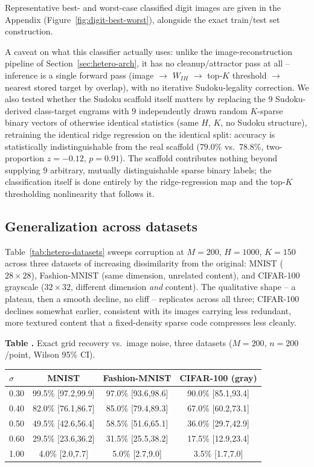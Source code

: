 \documentclass[11pt]{article}
\newcommand{\toprule}{\hline\hline}
\newcommand{\midrule}{\hline}
\newcommand{\bottomrule}{\hline\hline}
\begin{document}
Representative best- and worst-case classified digit images are given in the Appendix
(Figure~\ref{fig:digit-best-worst}), alongside the exact train/test set construction.

A caveat on what this classifier actually uses: unlike the image-reconstruction pipeline of
Section~\ref{sec:hetero-arch}, it has no cleanup/attractor pass at all -- inference is a single
forward pass (image $\to$ $W_{IH}$ $\to$ top-$K$ threshold $\to$ nearest stored target by
overlap), with no iterative Sudoku-legality correction. We also tested whether the Sudoku
scaffold itself matters by replacing the $9$ Sudoku-derived class-target engrams with $9$
independently drawn random $K$-sparse binary vectors of otherwise identical statistics (same
$H$, $K$, no Sudoku structure), retraining the identical ridge regression on the identical
split: accuracy is statistically indistinguishable from the real scaffold ($79.0\%$ vs.\
$78.8\%$, two-proportion $z=-0.12$, $p=0.91$). The scaffold contributes nothing beyond
supplying $9$ arbitrary, mutually distinguishable sparse binary labels; the classification
itself is done entirely by the ridge-regression map and the top-$K$ thresholding nonlinearity
that follows it.

\subsection{Generalization across datasets}
\label{sec:generalization}

Table~\ref{tab:hetero-datasets} sweeps corruption at $M{=}200$, $H{=}1000$, $K{=}150$ across
three datasets of increasing dissimilarity from the original: MNIST ($28\times28$), Fashion-MNIST
(same dimension, unrelated content), and CIFAR-100 grayscale ($32\times32$, different dimension
\emph{and} content). The qualitative shape -- a plateau, then a smooth decline, no cliff --
replicates across all three; CIFAR-100 declines somewhat earlier, consistent with its images
carrying less redundant, more textured content that a fixed-density sparse code compresses less
cleanly.

\label{tab:hetero-datasets}
\noindent\textbf{Table \thetable.} Exact grid recovery vs.\ image noise, three datasets ($M{=}200$, $n{=}200$/point,
Wilson 95\% CI).
\begin{center}
\begin{tabular}{lccc}
\toprule
$\sigma$ & MNIST & Fashion-MNIST & CIFAR-100 (gray) \\
\midrule
0.30 & 99.5\% [97.2,99.9] & 97.0\% [93.6,98.6] & 90.0\% [85.1,93.4] \\
0.40 & 82.0\% [76.1,86.7] & 85.0\% [79.4,89.3] & 67.0\% [60.2,73.1] \\
0.50 & 49.5\% [42.6,56.4] & 58.5\% [51.6,65.1] & 36.0\% [29.7,42.9] \\
0.60 & 29.5\% [23.6,36.2] & 31.5\% [25.5,38.2] & 17.5\% [12.9,23.4] \\
1.00 & 4.0\% [2.0,7.7] & 5.0\% [2.7,9.0] & 3.5\% [1.7,7.0] \\
\bottomrule
\end{tabular}
\end{center}
\end{document}
